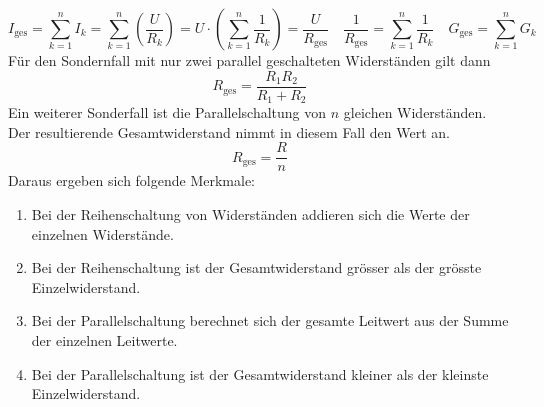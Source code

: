\begin{equation}
\boxed{I_{\text{ges}}=\displaystyle \sum_{k=1}^nI_{ k}=\displaystyle \sum_{k=1}^n\left(\dfrac{U}{R_k}\right)=U\cdot \left(\displaystyle \sum_{k=1}^n\dfrac{1}{R_{k}}\right)=\dfrac{U}{R_{\text{ges}}}}\quad \boxed{\dfrac{1}{R_{\text{ges}}}=\displaystyle \sum_{k=1}^n\dfrac{1}{R_k}}\quad \boxed{G_{\text{ges}}=\displaystyle \sum_{k=1}^nG_k}
\end{equation}
Für den Sondernfall mit nur zwei parallel geschalteten Widerständen gilt dann
\begin{equation}
\boxed{R_{\text{ges}}=\dfrac{R_1R_2}{R_1+R_2}}
\end{equation}
Ein weiterer Sonderfall ist die Parallelschaltung von $n$ gleichen Widerständen. Der resultierende Gesamtwiderstand nimmt in diesem Fall den Wert an. 
\begin{equation}
\boxed{R_{\text{ges}}=\dfrac{R}{n}}
\end{equation}
Daraus ergeben sich folgende Merkmale:
\begin{enumerate}[$(a)$]
\item Bei der Reihenschaltung von Widerständen addieren sich die Werte der einzelnen Widerstände. 
\item Bei der Reihenschaltung ist der Gesamtwiderstand grösser als der grösste Einzelwiderstand.
\item Bei der Parallelschaltung berechnet sich der gesamte Leitwert aus der Summe der einzelnen Leitwerte.
\item Bei der Parallelschaltung ist der Gesamtwiderstand kleiner als der kleinste Einzelwiderstand.
\end{enumerate}
